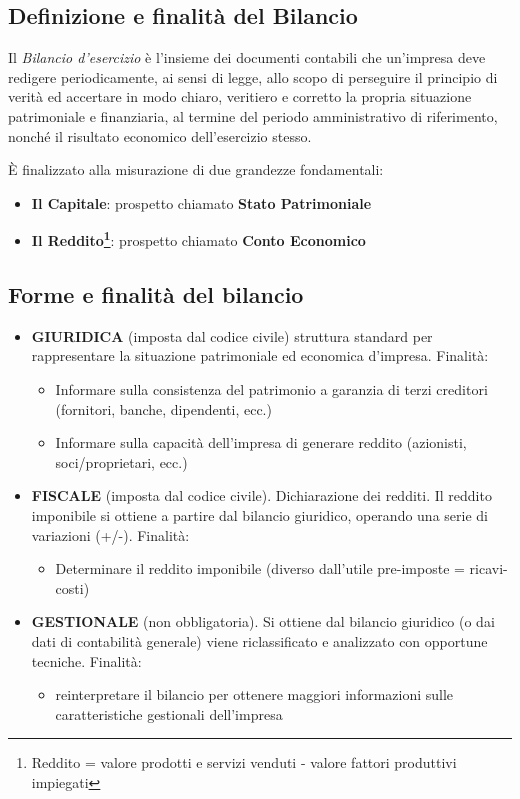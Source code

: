 \subsection{Definizione e finalità del Bilancio}
Il \textit{Bilancio d'esercizio} è l'insieme dei documenti contabili che un’impresa deve redigere periodicamente, ai sensi di legge, allo scopo di perseguire il principio di verità ed accertare in modo chiaro, veritiero e corretto la propria situazione patrimoniale e finanziaria, al termine del periodo amministrativo di riferimento, nonché il risultato economico dell'esercizio stesso.

È finalizzato alla misurazione di due grandezze fondamentali:
\begin{itemize}
	\item \textbf{Il Capitale}: prospetto chiamato \textbf{Stato Patrimoniale}
	\item \textbf{Il Reddito\footnote{Reddito = valore prodotti e servizi venduti - valore fattori produttivi impiegati}}: prospetto chiamato \textbf{Conto Economico}
\end{itemize}

\subsection{Forme e finalità del bilancio}
\begin{itemize}
	\item \textbf{GIURIDICA} (imposta dal codice civile) struttura standard per rappresentare la situazione patrimoniale ed economica d’impresa. Finalità:
		\begin{itemize}
			\item Informare sulla consistenza del patrimonio a garanzia di terzi creditori (fornitori, banche, dipendenti, ecc.)
			\item Informare sulla capacità dell’impresa di generare reddito (azionisti, soci/proprietari, ecc.)
		\end{itemize}
	\item \textbf{FISCALE} (imposta dal codice civile). Dichiarazione dei redditi. Il reddito imponibile si ottiene a partire dal bilancio giuridico, operando una serie
		di variazioni (+/-). Finalità:
		\begin{itemize}
			\item Determinare il reddito imponibile (diverso dall’utile pre-imposte = ricavi-costi)
		\end{itemize}
	\item \textbf{GESTIONALE} (non obbligatoria). Si ottiene dal bilancio giuridico (o dai dati di contabilità generale) viene riclassificato e analizzato con opportune tecniche. Finalità:
		\begin{itemize}
			\item reinterpretare il bilancio per ottenere maggiori informazioni sulle caratteristiche gestionali dell’impresa
		\end{itemize}
\end{itemize}


